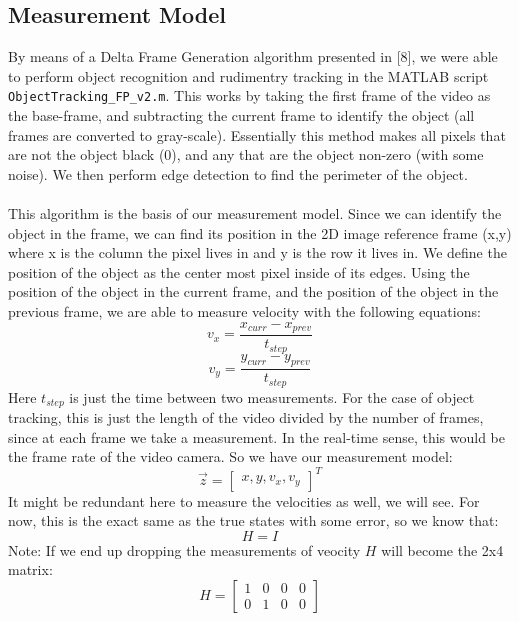 \documentclass{article} %
\begin{document}
\subsection{Measurement Model}
By means of a Delta Frame Generation algorithm presented in [8], we were able to perform object recognition and rudimentry tracking in the MATLAB script \texttt{ObjectTracking\_FP\_v2.m}. This works by taking the first frame of the video as the base-frame, and subtracting the current frame to identify the object (all frames are converted to gray-scale). Essentially this method makes all pixels that are not the object black (0), and any that are the object non-zero (with some noise). We then perform edge detection to find the perimeter of the object.\\\\
This algorithm is the basis of our measurement model. Since we can identify the object in the frame, we can find its position in the 2D image reference frame (x,y) where x is the column the pixel lives in and y is the row it lives in. We define the position of the object as the center most pixel inside of its edges. Using the position of the object in the current frame, and the position of the object in the previous frame, we are able to measure velocity with the following equations:
\begin{equation}
v_x = \frac{x_{curr} - x_{prev}}{t_{step}}
\end{equation}
\begin{equation}
v_y = \frac{y_{curr} - y_{prev}}{t_{step}}
\end{equation}
Here $t_{step}$ is just the time between two measurements. For the case of object tracking, this is just the length of the video divided by the number of frames, since at each frame we take a measurement. In the real-time sense, this would be the frame rate of the video camera. So we have our measurement model:
\[ \vec{z} = 
\begin{bmatrix}
 x, y, v_x, v_y
\end{bmatrix}^T
\]
It might be redundant here to measure the velocities as well, we will see. For now, this is the exact same as the true states with some error, so we know that:
\[ H = I \]
Note: If we end up dropping the measurements of veocity $H$ will become the 2x4 matrix:
\[ H =  
\begin{bmatrix}
 1 & 0 & 0 & 0 \\
 0 & 1 & 0 & 0 
\end{bmatrix}
\]
\end{document}
